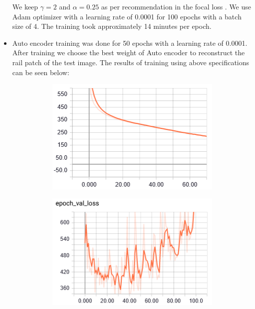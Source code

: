 \documentclass[conference]{IEEEtran}
\begin{document}
\begin{itemize}
 
 We keep $\gamma = 2$ and $\alpha = 0.25$ as per recommendation in the focal loss \cite{lin2018focal}. 
 We use Adam \cite{kingma2017adam} optimizer with a learning rate of 0.0001 for 100 epochs with a batch size of 4. The training took approximately 14 minutes per epoch. 
\item Auto encoder training was done for 50 epochs with a learning rate of 0.0001. After training we choose the best weight of Auto encoder to reconstruct the rail patch of the test image. The results of training using above specifications can be seen below:
\begin{figure}[htbp]
\begin{subfigure}[b]{0.23\textwidth}
 \centerline{\includegraphics[width=\textwidth]{training_loss_Unet_lr_1e-4.png}}
\end{subfigure}
\hfill
\begin{subfigure}[b]{0.23\textwidth}
 \centerline{\includegraphics[width=\textwidth]{val_loss_Unet_lr_1e-4.png}}
\end{subfigure}


\end{figure}
\end{itemize}
\end{document}

